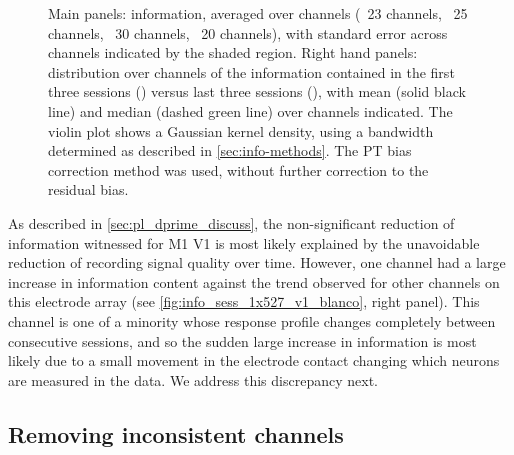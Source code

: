 \begin{figure}[htbp]
{%
Main panels: information, averaged over channels (\protect{}~\num{23} channels, \protect{}~\num{25} channels, \protect{}~\num{30} channels, \protect{}~\num{20} channels), with standard error across channels indicated by the shaded region.
Right hand panels: distribution over channels of the information contained in the first three sessions () versus last three sessions (), with mean (solid black line) and median (dashed green line) over channels indicated.
The violin plot shows a Gaussian kernel density, using a bandwidth determined as described in \autoref{sec:info-methods}.
The \ac{PT} bias correction method was used, without further correction to the residual bias.
}
    \label{fig:info_sess_1x527}
\end{figure}


As described in \autoref{sec:pl_dprime_discuss}, the non-significant reduction of information witnessed for \ac{M1} \ac{V1} is most likely explained by the unavoidable reduction of recording signal quality over time.
However, one channel had a large increase in information content against the trend observed for other channels on this electrode array (see \autoref{fig:info_sess_1x527_v1_blanco}, right panel).
This channel is one of a minority whose response profile changes completely between consecutive sessions, and so the sudden large increase in information is most likely due to a small movement in the electrode contact changing which neurons are measured in the data.
We address this discrepancy next.


\subsection{Removing inconsistent channels}

